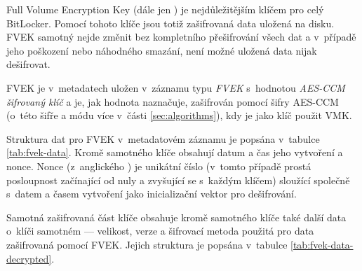 
Full Volume Encryption Key (dále jen ) je nejdůležitějším klíčem pro celý BitLocker. Pomocí tohoto klíče jsou totiž zašifrovaná data uložená na disku. FVEK samotný nejde změnit bez kompletního přešifrování všech dat a v~případě jeho poškození nebo náhodného smazání, není možné uložená data nijak dešifrovat.

FVEK je v~metadatech uložen v~záznamu typu \emph{FVEK} s~hodnotou \emph{AES-CCM šifrovaný klíč} a je, jak hodnota naznačuje, zašifrován pomocí šifry AES-CCM (o~této šifře a módu více v~části \ref{sec:algorithms}), kdy je jako klíč použit VMK.


Struktura dat pro FVEK v~metadatovém záznamu je popsána v~tabulce \ref{tab:fvek-data}. Kromě samotného klíče obsahují datum a čas jeho vytvoření a nonce.\cite{Metz2011,Kornblum2009} Nonce (z~anglického ) je unikátní číslo (v~tomto případě prostá posloupnost začínající od nuly a zvyšující se s~každým klíčem) sloužící společně s~datem a časem vytvoření jako inicializační vektor pro dešifrování\cite{Kohnoc2010}.

Samotná zašifrovaná část klíče obsahuje kromě samotného klíče také další data o~klíči samotném --- velikost, verze a šifrovací metoda použitá pro data zašifrovaná pomocí FVEK. Jejich struktura je popsána v~tabulce \ref{tab:fvek-data-decrypted}.\cite{Metz2011,Kornblum2009}


